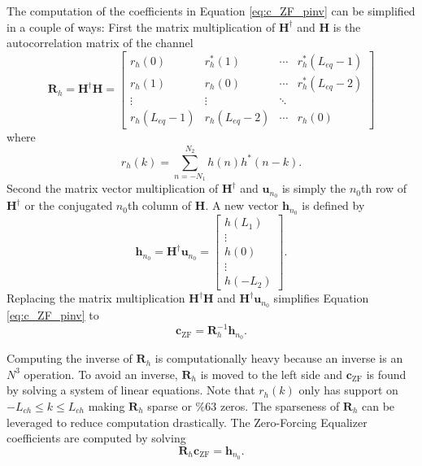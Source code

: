 The computation of the coefficients in Equation \eqref{eq:c_ZF_pinv} can be simplified in a couple of ways: First the matrix multiplication of $\mathbf{H}^\dagger$ and $\mathbf{H}$ is the autocorrelation matrix of the channel
\begin{equation}
\mathbf{R}_{h} = 
\mathbf{H}^\dagger \mathbf{H} = 
		\begin{bmatrix}
		r_{h}(0)		& r^\ast_{h}(1)	& \cdots 	& r^\ast_{h}(L_{eq}-1)  	\\
		r_{h}(1) 		& r_{h}(0)		& \cdots 	& r^\ast_{h}(L_{eq}-2)  	\\
		\vdots	 			& \vdots				& \ddots 	&  							\\
		r_{h}(L_{eq}-1)	& r_{h}(L_{eq}-2)	& \cdots	& r_{h}(0)  			
	\end{bmatrix}
	\label{eq:R_h}
\end{equation}
where
\begin{equation}
r_{h}(k) = \sum_{n=-N_1}^{N_2} h(n) h^\ast(n-k).
\end{equation}
Second the matrix vector multiplication of $\mathbf{H}^\dagger$ and $\mathbf{u}_{n_0}$ is simply the $n_0$th row of $\mathbf{H}^\dagger$ or the conjugated $n_0$th column of $\mathbf{H}$.
A new vector $\mathbf{h}_{n_0}$ is defined by
\begin{equation}
\mathbf{h}_{n_0} = \mathbf{H}^\dagger \mathbf{u}_{n_0} = 
\begin{bmatrix} h(L_1) \\ \vdots \\ h(0) \\ \vdots \\ h(-L_2)  \end{bmatrix}.
\label{eq:h_no}
\end{equation}
Replacing the matrix multiplication $\mathbf{H}^\dagger \mathbf{H}$ and $\mathbf{H}^\dagger \mathbf{u}_{n_0}$ simplifies Equation \eqref{eq:c_ZF_pinv} to
\begin{equation}
\mathbf{c}_\text{ZF} = \mathbf{R}^{-1}_{h} \mathbf{h}_{n_0}.
\label{eq:c_ZF_R_h}
\end{equation}

Computing the inverse of $\mathbf{R}_{h}$ is computationally heavy because an inverse is an $N^3$ operation.
To avoid an inverse, $\mathbf{R}_{h}$ is moved to the left side and $\mathbf{c}_\text{ZF}$ is found by solving a system of linear equations. 
Note that $r_{h}(k)$ only has support on $-L_{ch} \leq k \leq L_{ch}$ making $\mathbf{R}_{h}$ sparse or $\%63$ zeros.
The sparseness of $\mathbf{R}_{h}$ can be leveraged to reduce computation drastically.
The Zero-Forcing Equalizer coefficients are computed by solving
\begin{equation}
\mathbf{R}_h \mathbf{c}_\text{ZF} = \mathbf{h}_{n_0}.
\label{eq:c_ZF_solve}
\end{equation}


